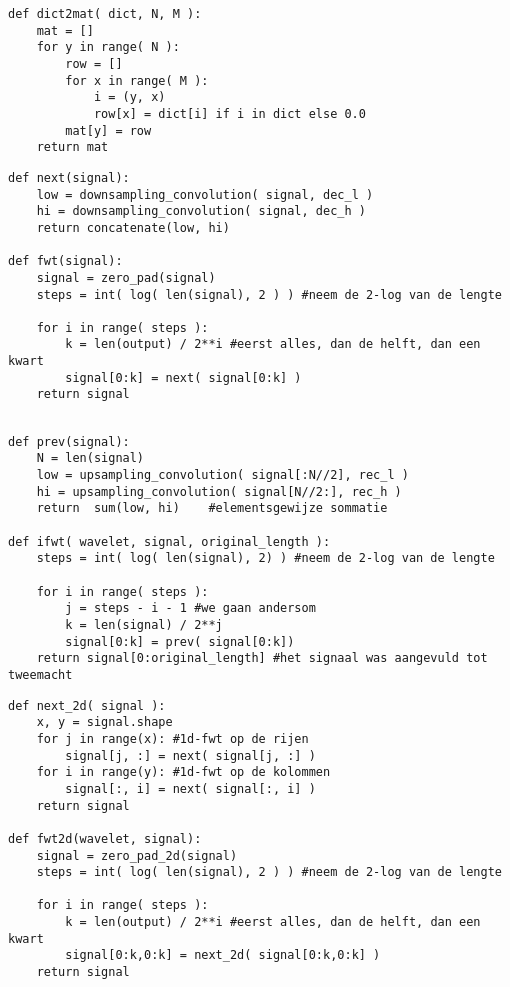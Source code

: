 \begin{lstlisting}[label=dict2mat,float=h!,caption=Dictionary naar matrix conversie]
def dict2mat( dict, N, M ):
	mat = []
	for y in range( N ):
		row = []
		for x in range( M ):
			i = (y, x)
			row[x] = dict[i] if i in dict else 0.0
		mat[y] = row
	return mat
\end{lstlisting}

\begin{lstlisting}[label=next,float=h!,caption=De FWT]
def next(signal):
	low = downsampling_convolution( signal, dec_l )
	hi = downsampling_convolution( signal, dec_h )
	return concatenate(low, hi)
	
def fwt(signal):
	signal = zero_pad(signal)
	steps = int( log( len(signal), 2 ) ) #neem de 2-log van de lengte
	
	for i in range( steps ):
		k = len(output) / 2**i #eerst alles, dan de helft, dan een kwart
		signal[0:k] = next( signal[0:k] )
	return signal
	
\end{lstlisting}

\begin{lstlisting}[label=prev,float=h!,caption=De iFWT]
def prev(signal):
	N = len(signal)
	low = upsampling_convolution( signal[:N//2], rec_l )
	hi = upsampling_convolution( signal[N//2:], rec_h )
	return  sum(low, hi) 	#elementsgewijze sommatie
	
def ifwt( wavelet, signal, original_length ):
	steps = int( log( len(signal), 2) ) #neem de 2-log van de lengte
	
	for i in range( steps ):
		j = steps - i - 1 #we gaan andersom
		k = len(signal) / 2**j
		signal[0:k] = prev( signal[0:k])
	return signal[0:original_length] #het signaal was aangevuld tot tweemacht
\end{lstlisting}

\begin{lstlisting}[label=fwt2d,float=h!,caption=De Mallatdecompositie in 2 dimensies]
def next_2d( signal ):
	x, y = signal.shape
	for j in range(x): #1d-fwt op de rijen
		signal[j, :] = next( signal[j, :] )
	for i in range(y): #1d-fwt op de kolommen
		signal[:, i] = next( signal[:, i] )
	return signal

def fwt2d(wavelet, signal):
	signal = zero_pad_2d(signal)
	steps = int( log( len(signal), 2 ) ) #neem de 2-log van de lengte
	
	for i in range( steps ):
		k = len(output) / 2**i #eerst alles, dan de helft, dan een kwart
		signal[0:k,0:k] = next_2d( signal[0:k,0:k] )
	return signal
\end{lstlisting}


